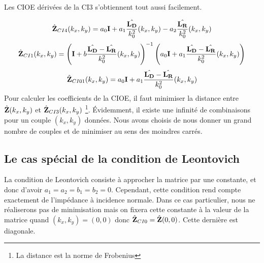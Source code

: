     Les CIOE dérivées de la CI3 s'obtiennent tout aussi facilement.

    \begin{equation*}
        \hat{\mathbf{Z}}_{CI4}(k_x,k_y) = a_0 \mathbf{I} + a_1 \dfrac{\hat{\mathbf{L_D}}}{k_0^2}(k_x,k_y) - a_2 \dfrac{\hat{\mathbf{L_R}}}{k_0^2}(k_x,k_y)
    \end{equation*}
    \begin{equation*}
        \hat{\mathbf{Z}}_{CI1}(k_x,k_y) =  \left(\mathbf{I} + b \dfrac{\hat{\mathbf{L_D}} - \hat{\mathbf{L_R}}}{k_0^2}(k_x,k_y) \right)^{-1}\left(a_0\mathbf{I} + a_1 \dfrac{\hat{\mathbf{L_D}} - \hat{\mathbf{L_R}}}{k_0^2}(k_x,k_y) \right)
    \end{equation*}
    \begin{equation*}
        \hat{\mathbf{Z}}_{CI01}(k_x,k_y) =  a_0\mathbf{I} + a_1 \dfrac{\hat{\mathbf{L_D}} - \hat{\mathbf{L_R}}}{k_0^2}(k_x,k_y)
    \end{equation*}
    Pour calculer les coefficients de la CIOE, il faut minimiser la distance entre \(\hat{\mathbf{Z}}(k_x,k_y)\) et \(\hat{\mathbf{Z}}_{CI3}(k_x,k_y)\) \footnote{La distance est la norme de Frobenius}. Évidemment, il existe une infinité de combinaisons pour un couple \((k_x,k_y)\) données. Nous avons choisis de nous donner un grand nombre de couples et de minimiser au sens des moindres carrés.

  \subsection{Le cas spécial de la condition de Leontovich}

    La condition de Leontovich consiste à approcher la matrice par une constante, et donc d'avoir \(a_1=a_2=b_1=b_2=0\). Cependant, cette condition rend compte exactement de l'impédance à incidence normale. Dans ce cas particulier, nous ne réaliserons pas de minimisation mais on fixera cette constante à la valeur de la matrice quand \((k_x,k_y) = (0,0)\) donc \( \hat{\mathbf{Z}}_{CI0}  = \hat{\mathbf{Z}}(0,0)\). Cette dernière est diagonale.